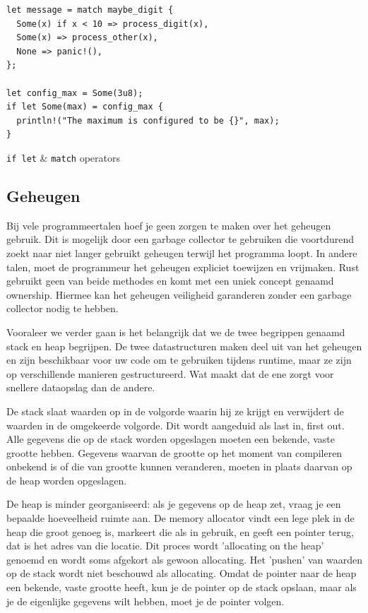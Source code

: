 \begin{listing}[h]
\begin{verbatim}
let message = match maybe_digit {
  Some(x) if x < 10 => process_digit(x),
  Some(x) => process_other(x),
  None => panic!(),
};

let config_max = Some(3u8);
if let Some(max) = config_max {
  println!("The maximum is configured to be {}", max);
}
\end{verbatim}
\caption{\texttt{if let} \& \texttt{match} operators}
\end{listing}

\clearpage

\subsection{Geheugen}

Bij vele programmeertalen hoef je geen zorgen te maken over het geheugen gebruik. Dit is mogelijk
door een garbage collector te gebruiken die voortdurend zoekt naar niet langer gebruikt geheugen
terwijl het programma loopt. In andere talen, moet de programmeur het geheugen expliciet toewijzen
en vrijmaken. Rust gebruikt geen van beide methodes en komt met een uniek concept genaamd ownership.
Hiermee kan het geheugen veiligheid garanderen zonder een garbage collector nodig te hebben. 

Vooraleer we verder gaan is het belangrijk dat we de twee begrippen genaamd stack en heap begrijpen.
De twee datastructuren maken deel uit van het geheugen en zijn beschikbaar voor uw code om te
gebruiken tijdens runtime, maar ze zijn op verschillende manieren gestructureerd. Wat maakt dat de
ene zorgt voor snellere dataopslag dan de andere. 

De stack slaat waarden op in de volgorde waarin hij ze krijgt en verwijdert de waarden in de
omgekeerde volgorde. Dit wordt aangeduid als last in, first out. Alle gegevens die op de stack
worden opgeslagen moeten een bekende, vaste grootte hebben. Gegevens waarvan de grootte op het
moment van compileren onbekend is of die van grootte kunnen veranderen, moeten in plaats daarvan op
de heap worden opgeslagen. 

De heap is minder georganiseerd: als je gegevens op de heap zet, vraag je een bepaalde hoeveelheid
ruimte aan. De memory allocator vindt een lege plek in de heap die groot genoeg is, markeert die als
in gebruik, en geeft een pointer terug, dat is het adres van die locatie. Dit proces wordt
'allocating on the heap' genoemd en wordt soms afgekort als gewoon allocating. Het 'pushen' van
waarden op de stack wordt niet beschouwd als allocating. Omdat de pointer naar de heap een bekende,
vaste grootte heeft, kun je de pointer op de stack opslaan, maar als je de eigenlijke gegevens wilt
hebben, moet je de pointer volgen. 

